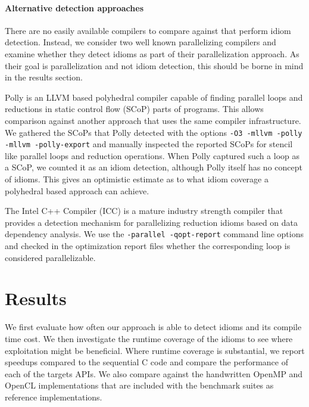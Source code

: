     \paragraph{Alternative detection approaches}
    \hspace{0.2cm}There are no easily available compilers to compare against
    that perform idiom detection.
    Instead, we consider two well known parallelizing compilers and examine
    whether they detect idioms as part of their parallelization approach.
    As their goal is parallelization and not idiom detection, this should be
    borne in mind in the results section.

    Polly \cite{Doerfert2015Polly} is an LLVM based polyhedral compiler
    capable of finding parallel loops and reductions in static control
    flow (SCoP) parts of programs.  This allows comparison against
    another approach that uses the same compiler infrastructure.
    We gathered the SCoPs that Polly detected with the options
    \texttt{-O3 -mllvm -polly -mllvm -polly-export} and manually inspected
    the reported SCoPs for stencil like parallel loops and reduction operations.
    When Polly captured such a loop as a SCoP, we counted it as an idiom
    detection, although Polly itself has no concept of idioms.
    This gives an optimistic estimate as to what idiom coverage a polyhedral
    based approach can achieve.

    The Intel C++ Compiler (ICC) is a mature industry strength compiler that
    provides a detection mechanism for parallelizing reduction idioms based on
    data dependency analysis.
    We use the \texttt{-parallel -qopt-report} command line options and checked
    in the optimization report files whether the corresponding loop is
    considered parallelizable.

\section{Results}

    We first evaluate how often our approach is able to detect idioms and its
    compile time cost.
    We then investigate the runtime coverage of the idioms to see where
    exploitation might be beneficial.
    Where runtime coverage is substantial, we report speedups compared to the
    sequential C code and compare the performance of each of the targets APIs.
    We also compare against the handwritten OpenMP and OpenCL implementations
    that are included with the benchmark suites as reference implementations.

